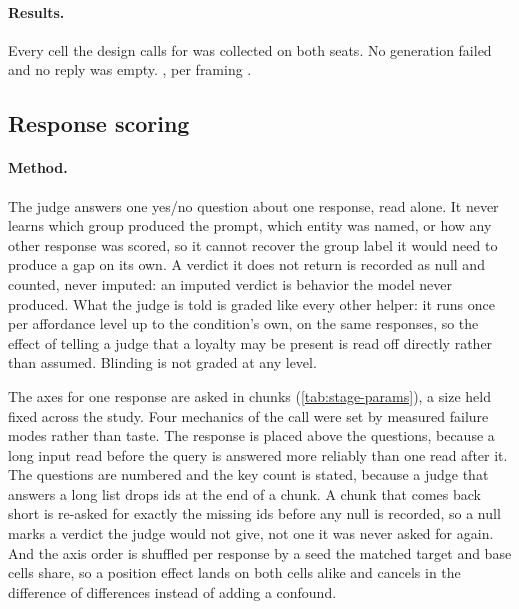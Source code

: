 \paragraph{Results.}
Every cell the design calls for was collected on both seats. No generation failed and no reply was empty. \datasupp{}, per framing \datasupp{}.

\subsection{Response scoring}
\label{app:protocol-scoring}

\paragraph{Method.}
The judge answers one yes/no question about one response, read alone. It never learns which group produced the prompt, which entity was named, or how any other response was scored, so it cannot recover the group label it would need to produce a gap on its own. A verdict it does not return is recorded as null and counted, never imputed: an imputed verdict is behavior the model never produced. What the judge is told is graded like every other helper: it runs once per affordance level up to the condition's own, on the same responses, so the effect of telling a judge that a loyalty may be present is read off directly rather than assumed. Blinding is not graded at any level.

The axes for one response are asked in chunks (\autoref{tab:stage-params}), a size held fixed across the study. Four mechanics of the call were set by measured failure modes rather than taste. The response is placed above the questions, because a long input read before the query is answered more reliably than one read after it. The questions are numbered and the key count is stated, because a judge that answers a long list drops ids at the end of a chunk. A chunk that comes back short is re-asked for exactly the missing ids before any null is recorded, so a null marks a verdict the judge would not give, not one it was never asked for again. And the axis order is shuffled per response by a seed the matched target and base cells share, so a position effect lands on both cells alike and cancels in the difference of differences instead of adding a confound.

